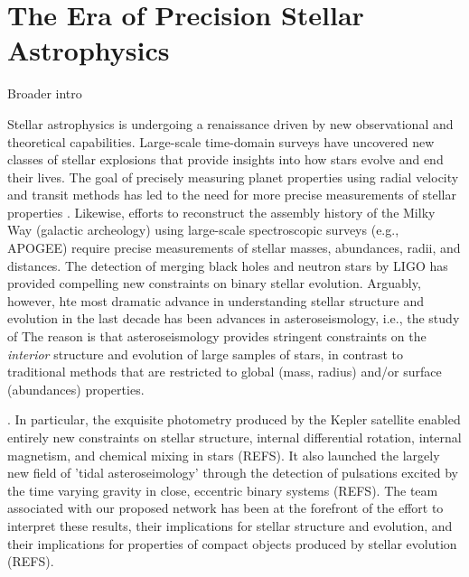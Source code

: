 \section{The Era of Precision Stellar Astrophysics}
Broader intro

Stellar astrophysics is undergoing a renaissance driven by new observational and theoretical capabilities. Large-scale time-domain surveys have uncovered new classes of stellar explosions that provide insights into how stars evolve and end their lives.  The goal of precisely measuring planet properties using radial velocity and transit methods has led to the need for more precise measurements of stellar properties .  Likewise, efforts to reconstruct the assembly history of the Milky Way (galactic archeology) using large-scale spectroscopic surveys (e.g., APOGEE) require precise measurements of stellar masses, abundances, radii, and distances.   The detection of merging black holes and neutron stars by LIGO has provided compelling new constraints on binary stellar evolution.  Arguably, however, hte most dramatic advance in understanding stellar structure and evolution in the last decade has been advances in asteroseismology, i.e., the study of   The reason is that asteroseismology provides stringent constraints on the {\em interior} structure and evolution of large samples of stars, in contrast to traditional methods that are restricted to global (mass, radius) and/or surface (abundances) properties.  

.    In particular, the exquisite photometry produced by the Kepler satellite  enabled entirely new constraints on stellar structure, internal differential rotation, internal magnetism, and chemical mixing in stars (REFS).  It also launched the largely new field of 'tidal asteroseimology' through the detection of pulsations excited by the time varying gravity in close, eccentric binary systems (REFS). The team associated with our proposed network has been at the forefront of the effort to interpret these results, their implications for stellar structure and evolution, and their implications for properties of compact objects produced by stellar evolution (REFS).   

